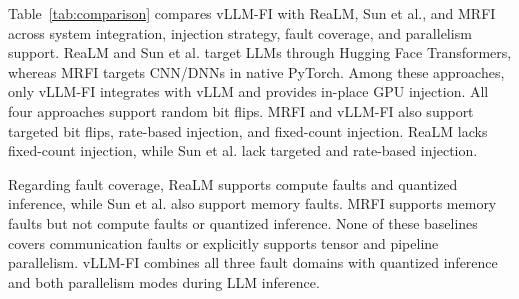 Table~\ref{tab:comparison} compares vLLM-FI with ReaLM, Sun et al., and MRFI across system integration, injection strategy, fault coverage, and parallelism support. ReaLM and Sun et al. target LLMs through Hugging Face Transformers, whereas MRFI targets CNN/DNNs in native PyTorch. Among these approaches, only vLLM-FI integrates with vLLM and provides in-place GPU injection. All four approaches support random bit flips. MRFI and vLLM-FI also support targeted bit flips, rate-based injection, and fixed-count injection. ReaLM lacks fixed-count injection, while Sun et al. lack targeted and rate-based injection.

Regarding fault coverage, ReaLM supports compute faults and quantized inference, while Sun et al. also support memory faults. MRFI supports memory faults but not compute faults or quantized inference. None of these baselines covers communication faults or explicitly supports tensor and pipeline parallelism. vLLM-FI combines all three fault domains with quantized inference and both parallelism modes during LLM inference.

